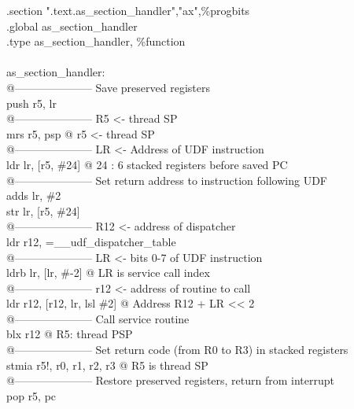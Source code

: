 \begin{SHELL}\small
\hspace*{1.2em}.section	".text.as\_section\_handler","ax",\%progbits\\
\hspace*{1.2em}.global as\_section\_handler\\
\hspace*{1.2em}.type as\_section\_handler, \%function\\
\\
as\_section\_handler:\\
@--------------------- Save preserved registers\\
\hspace*{1.2em}push  {r5, lr}\\
@--------------------- R5 <- thread SP\\
\hspace*{1.2em}mrs   r5, psp           @ r5 <- thread SP\\
@--------------------- LR <- Address of UDF instruction\\
\hspace*{1.2em}ldr   lr, [r5, \#24]     @ 24 : 6 stacked registers before saved PC\\
@--------------------- Set return address to instruction following UDF\\
\hspace*{1.2em}adds  lr, \#2\\
\hspace*{1.2em}str   lr, [r5, \#24]\\
@--------------------- R12 <- address of dispatcher\\
\hspace*{1.2em}ldr   r12, =\_\_udf\_dispatcher\_table\\
@--------------------- LR <- bits 0-7 of UDF instruction\\
\hspace*{1.2em}ldrb  lr, [lr, \#-2]            @ LR is service call index\\
@--------------------- r12 <- address of routine to call\\
\hspace*{1.2em}ldr   r12, [r12, lr, lsl \#2]   @ Address R12 + LR << 2\\
@--------------------- Call service routine\\
\hspace*{1.2em}blx   r12                      @ R5: thread PSP\\
@--------------------- Set return code (from R0 to R3) in stacked registers\\
\hspace*{1.2em}stmia r5!, {r0, r1, r2, r3}    @ R5 is thread SP\\
@--------------------- Restore preserved registers, return from interrupt\\
\hspace*{1.2em}pop   {r5, pc}
\end{SHELL}

